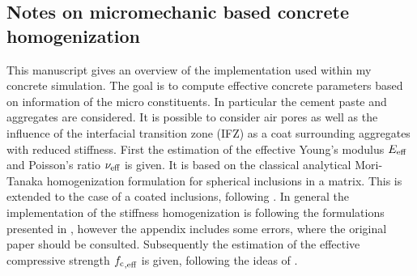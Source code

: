 \subsection{Notes on micromechanic based concrete homogenization}
This manuscript gives an overview of the implementation used within my concrete simulation.
The goal is to compute effective concrete parameters based on information of the micro constituents.
In particular the cement paste and aggregates are considered.
It is possible to consider air pores as well as the influence of the interfacial transition zone (IFZ) as a coat surrounding aggregates with reduced stiffness. 
First the estimation of the effective Young's modulus $E_{\text{eff}}$ and Poisson's ratio $\nu_{\text{eff}}$ is given.
It is based on the classical analytical Mori-Tanaka homogenization formulation \cite{mor_1973_asi} for spherical inclusions in a matrix.
This is extended to the case of a coated inclusions, following \cite{her_1993_nlib}.
In general the implementation of the stiffness homogenization is following the formulations presented in \cite{nee_2012_ammf}, however the appendix includes some errors, where the original paper \cite{her_1993_nlib} should be consulted.
Subsequently the estimation of the effective compressive strength ${f_{\text{c}}}_{,\text{eff}}$ is given, following the ideas of \cite{nev_2018_mcam}.

